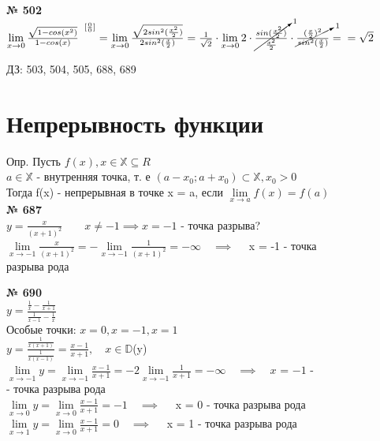 \documentclass[12pt]{article}
\newcommand{\RNum}[1]{\uppercase\expandafter{\romannumeral #1\relax}}
\begin{document}
{\vspace{.5cm}
{
	{\textbf{№ 502} \vspace{.5cm}\\}
	\large{ $\lim\limits_{x \to 0} \frac{\sqrt{1-cos(x^2)}}{1-cos(x)}^{\enspace [\frac{0}{0}]} = \lim\limits_{x \to 0} 
		\frac{\sqrt{2sin^2(\frac{x^2}{2})}}{2sin^2(\frac{x}{2})} = \frac{1}{\sqrt{2}} \cdot \lim\limits_{x \to 0} 2 \cdot \cancelto{1}{\frac{sin(\frac{x^2}{2})}{\frac{x^2}{2}}} \cdot \cancelto{1}{\frac{(\frac{x}{2})^2}{sin^2(\frac{x}{2})}} =\\= \sqrt{2}$\\
	}
}

\vspace{2cm}
ДЗ: 503, 504, 505, 688, 689

\newpage
\section{Непрерывность функции}
\vspace{2cm}
Опр. Пусть \ensuremath{f(x), x \in \mathbb{X} \subseteq R}\\
$a \in \mathbb{X}$ - внутренняя точка, т. е $(a-x_0; a+x_0) \subset \mathbb{X}, x_0 > 0$\\
Тогда f(x) - непрерывная в точке x = a, если $\lim\limits_{x \to a}f(x) = f(a)$\\

\vspace{.5cm}
{
	{\textbf{№ 687} \vspace{.5cm}\\}
	\large{ $y = \frac{x}{(x+1)^2} \qquad x \neq -1 \implies x=-1$ - точка разрыва?\\
		$\lim\limits_{x \to -1}\frac{x}{(x+1)^2} = -\lim\limits_{x \to -1} \frac{1}{(x+1)^2} = -\infty \quad \implies \quad $ x = -1 - точка \\разрыва \RNum{2} рода\\	
	}
}

\vspace{.5cm}
{
	{\textbf{№ 690} \vspace{.5cm}\\}
	\large{ $y = \frac{\frac{1}{x}-\frac{1}{x+1}}{\frac{1}{x-1}-\frac{1}{x}}$\\
		Особые точки: $x=0, x=-1, x=1$\\
		$y = \frac{\frac{1}{x(x+1)}}{\frac{1}{x(x-1)}}=\frac{x-1}{x+1}, \quad x \in \mathbb{D}$(y)\\
		$\lim\limits_{x \to -1}y = \lim\limits_{x \to -1}\frac{x-1}{x+1} = -2 \lim\limits_{x \to -1} \frac{1}{x+1} = -\infty \quad \implies \quad x$ = $-1$ -\\- точка разрыва \RNum{2} рода\vspace{.2cm}\\
		$\lim\limits_{x \to 0} y = \lim\limits_{x \to 0} \frac{x-1}{x+1}=-1 \quad \implies \quad $
		x = 0 - точка разрыва \RNum{3} рода\vspace{.2cm}\\
		$\lim\limits_{x \to 1} y = \lim\limits_{x \to 0} \frac{x-1}{x+1}=0 \quad \implies \quad $
		x = 1 - точка разрыва \RNum{3} рода\\
	}
}

}
\end{document}
